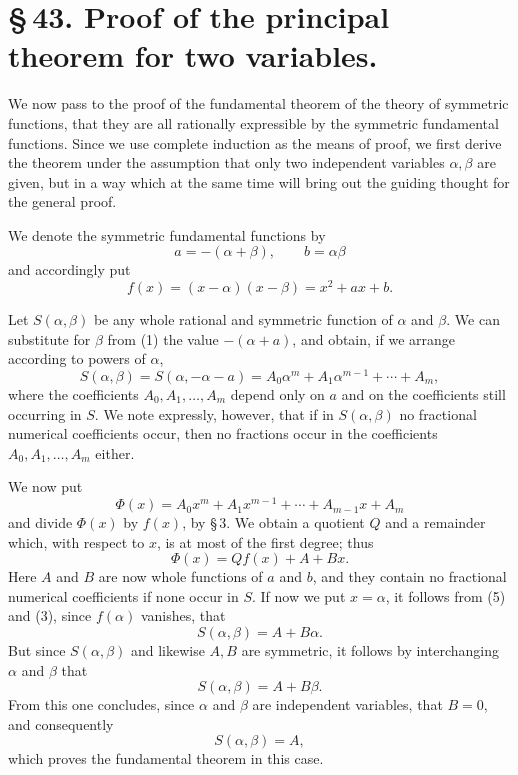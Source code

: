 \documentclass[11pt]{article}
\begin{document}
\section*{\S\,43. Proof of the principal theorem for two variables.}

We now pass to the proof of the fundamental theorem of the theory of symmetric functions, that they are all rationally expressible by the symmetric fundamental functions. Since we use complete induction as the means of proof, we first derive the theorem under the assumption that only two independent variables $\alpha,\beta$ are given, but in a way which at the same time will bring out the guiding thought for the general proof.

We denote the symmetric fundamental functions by
\begin{equation}
 a=-(\alpha+\beta),\qquad b=\alpha\beta
\tag{1}
\end{equation}
and accordingly put
\begin{equation}
 f(x)=(x-\alpha)(x-\beta)=x^2+ax+b.
\tag{2}
\end{equation}

Let $S(\alpha,\beta)$ be any whole rational and symmetric function of $\alpha$ and $\beta$. We can substitute for $\beta$ from (1) the value $-(\alpha+a)$, and obtain, if we arrange according to powers of $\alpha$,
\begin{equation}
 S(\alpha,\beta)=S(\alpha,-\alpha-a)=A_0\alpha^m+A_1\alpha^{m-1}+\cdots+A_m,
\tag{3}
\end{equation}
where the coefficients $A_0,A_1,\ldots,A_m$ depend only on $a$ and on the coefficients still occurring in $S$. We note expressly, however, that if in $S(\alpha,\beta)$ no fractional numerical coefficients occur, then no fractions occur in the coefficients $A_0,A_1,\ldots,A_m$ either.

We now put
\begin{equation}
 \Phi(x)=A_0x^m+A_1x^{m-1}+\cdots+A_{m-1}x+A_m
\tag{4}
\end{equation}
and divide $\Phi(x)$ by $f(x)$, by \S\,3. We obtain a quotient $Q$ and a remainder which, with respect to $x$, is at most of the first degree; thus
\begin{equation}
 \Phi(x)=Qf(x)+A+Bx.
\tag{5}
\end{equation}
Here $A$ and $B$ are now whole functions of $a$ and $b$, and they contain no fractional numerical coefficients if none occur in $S$. If now we put $x=\alpha$, it follows from (5) and (3), since $f(\alpha)$ vanishes, that
\begin{equation}
 S(\alpha,\beta)=A+B\alpha.
\tag{6}
\end{equation}
But since $S(\alpha,\beta)$ and likewise $A,B$ are symmetric, it follows by interchanging $\alpha$ and $\beta$ that
\begin{equation}
 S(\alpha,\beta)=A+B\beta.
\tag{7}
\end{equation}
From this one concludes, since $\alpha$ and $\beta$ are independent variables, that $B=0$, and consequently
\begin{equation}
 S(\alpha,\beta)=A,
\tag{8}
\end{equation}
which proves the fundamental theorem in this case.
\end{document}
